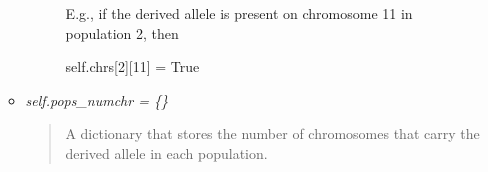 \documentclass[letterpaper,10pt,english]{sphinxmanual}
\begin{document}
\begin{fulllineitems}
\begin{itemize}
\begin{itemize}
\begin{description}
E.g., if the derived allele is present on chromosome 11 in
population 2, then

self.chrs{[}2{]}{[}11{]} = True

\end{description}

\item {} 
\emph{self.pops\_numchr = \{\}}
\begin{quote}

A dictionary that stores the number of chromosomes that
carry the derived allele in each population.
\end{quote}

\end{itemize}

\end{itemize}

\end{fulllineitems}

\end{document}
